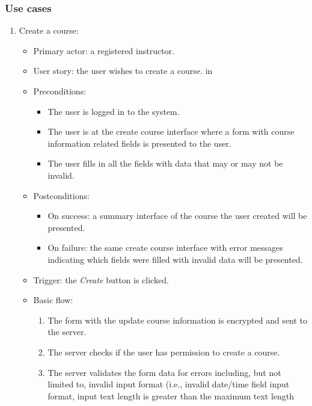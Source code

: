 \subsubsection{Use cases}
\begin{enumerate}
\item Create a course:
\begin{itemize}
    \item Primary actor: a registered instructor.
    \item User story: the user wishes to create a course.
     in
    \item Preconditions: 
        \begin{itemize}
            \item The user is logged in to the system.
            \item The user is at the create course interface where a form with
                course information related fields 
                is presented to the user.
            \item The user fills in all the fields with data that may or
                may not be invalid.
        \end{itemize}
    \item Postconditions:
        \begin{itemize}
            \item On success: a summary interface of the course the user created
                will be presented.
            \item On failure: the same create course interface with error
                messages indicating which fields were filled with invalid data
                will be presented.
        \end{itemize}
    \item Trigger: the \emph{Create} button is clicked.
    \item Basic flow:
        \begin{enumerate}
            \item The form with the update course information is encrypted and
                sent to the server.
            \item The server checks if the user has permission to create a
                course.
            \item The server validates the form data for errors including,
                but not limited to,
                invalid input format
                (i.e., invalid date/time field input format,
                input text length is greater than the maximum text length

\end{enumerate}
\end{itemize}
\end{enumerate}

